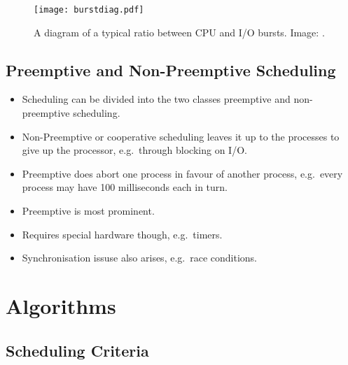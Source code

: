 \documentclass{beamer}
\begin{document}
\begin{frame}{\insertsubsectionhead}
  \begin{figure}
    \texttt{[image: burstdiag.pdf]}
    \caption{A diagram of a typical ratio between CPU and I/O bursts.
      Image: \cite{Silberschatz2013osc}.}
  \end{figure}
\end{frame}

\subsection{Preemptive and Non-Preemptive Scheduling}

\begin{frame}{\insertsubsectionhead}
  \begin{itemize}
    \item Scheduling can be divided into the two classes preemptive and 
      non-preemptive scheduling.

    \item Non-Preemptive or cooperative scheduling leaves it up to the 
      processes to give up the processor, e.g.\ through blocking on I/O.

    \item Preemptive does abort one process in favour of another process, e.g.\ 
      every process may have 100 milliseconds each in turn.

  \end{itemize}
\end{frame}

\begin{frame}{\insertsubsectionhead}
  \begin{itemize}
    \item Preemptive is most prominent.
    \item Requires special hardware though, e.g.\ timers.
    \item Synchronisation issuse also arises, e.g.\ race conditions.
  \end{itemize}
\end{frame}


\section{Algorithms}

\subsection{Scheduling Criteria}
\end{document}
